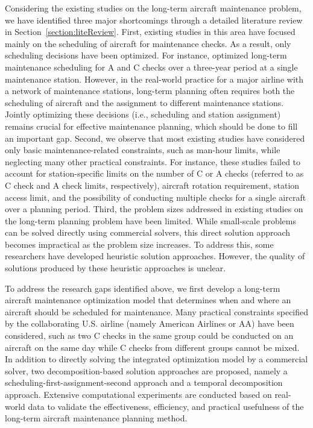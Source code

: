 Considering the existing studies on the long-term aircraft maintenance problem, we have identified three major shortcomings through a detailed literature review in Section~\ref{section:liteReview}.
First, existing studies in this area have focused mainly on the scheduling of aircraft for maintenance checks. As a result, only scheduling decisions have been optimized. For instance, \cite{deng2020practical} optimized long-term maintenance scheduling for A and C checks over a three-year period at a single maintenance station.  However, in the real-world practice for a major airline with a network of maintenance stations, long-term planning often requires both the scheduling of aircraft and the assignment to different maintenance stations. Jointly optimizing these decisions (i.e., scheduling and station assignment) remains crucial for effective maintenance planning, which should be done to fill an important gap. 
Second, we observe that most existing studies have considered only basic maintenance-related constraints, such as man-hour limits, while neglecting many other practical constraints. For instance, these studies failed to account for station-specific limits on the number of C or A checks (referred to as C check and A check limits, respectively), aircraft rotation requirement, station access limit, and the possibility of conducting multiple checks for a single aircraft over a planning period.
Third, the problem sizes addressed in existing studies on the long-term planning problem have been limited. While small-scale problems can be solved directly using commercial solvers, this direct solution approach becomes impractical as the problem size increases. To address this, some researchers have developed heuristic solution approaches. However, the quality of solutions produced by these heuristic approaches is unclear.


To address the research gaps identified above, we first develop a long-term aircraft maintenance optimization model that determines when and where an aircraft should be scheduled for maintenance. Many practical constraints specified by the collaborating U.S. airline (namely American Airlines or AA) have been considered, such as two C checks in the same group could be conducted on an aircraft on the same day while C checks from different groups cannot be mixed. In addition to directly solving the integrated optimization model by a commercial solver, two decomposition-based solution approaches are proposed, namely a scheduling-first-assignment-second approach and a temporal decomposition approach. Extensive computational experiments are conducted based on real-world data to validate the effectiveness, efficiency, and practical usefulness of the long-term aircraft maintenance planning method.



